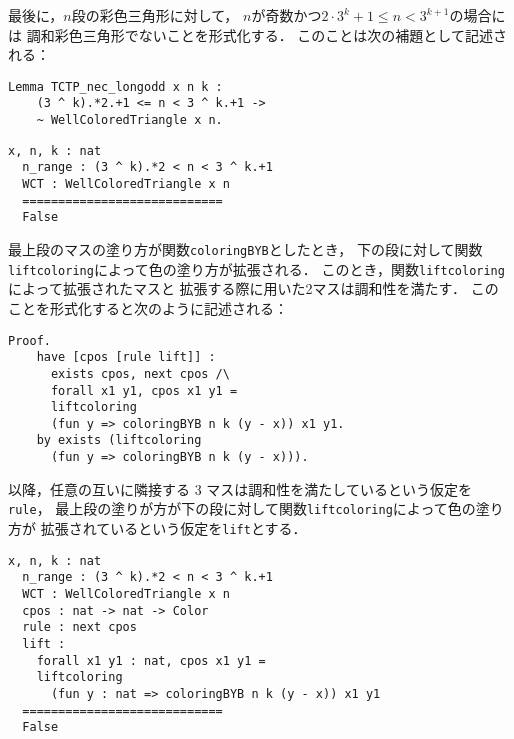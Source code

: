 最後に，$n$段の彩色三角形に対して，
$n$が奇数かつ$2 \cdot 3^{k} + 1 \leq n < 3^{k+1}$の場合には
調和彩色三角形でないことを形式化する．
このことは次の補題として記述される：
\begin{lstlisting}[language=Coq]
  Lemma TCTP_nec_longodd x n k :
    (3 ^ k).*2.+1 <= n < 3 ^ k.+1 ->
    ~ WellColoredTriangle x n.
\end{lstlisting}
\begin{lstlisting}[language=Coq]
  x, n, k : nat
  n_range : (3 ^ k).*2 < n < 3 ^ k.+1
  WCT : WellColoredTriangle x n
  ============================
  False
\end{lstlisting}
最上段のマスの塗り方が関数{\tt{coloringBYB}}としたとき，
下の段に対して関数{\tt{liftcoloring}}によって色の塗り方が拡張される．
このとき，関数{\tt{liftcoloring}}によって拡張されたマスと
拡張する際に用いた2マスは調和性を満たす．
このことを形式化すると次のように記述される：
\begin{lstlisting}[language=Coq]
  Proof.
    have [cpos [rule lift]] :
      exists cpos, next cpos /\
      forall x1 y1, cpos x1 y1 =
      liftcoloring
      (fun y => coloringBYB n k (y - x)) x1 y1.
    by exists (liftcoloring
      (fun y => coloringBYB n k (y - x))).
\end{lstlisting}
以降，任意の互いに隣接する 3 マスは調和性を満たしているという仮定を{\tt{rule}}，
最上段の塗りが方が下の段に対して関数{\tt{liftcoloring}}によって色の塗り方が
拡張されているという仮定を{\tt{lift}}とする．
\begin{lstlisting}[language=Coq]
  x, n, k : nat
  n_range : (3 ^ k).*2 < n < 3 ^ k.+1
  WCT : WellColoredTriangle x n
  cpos : nat -> nat -> Color
  rule : next cpos
  lift :
    forall x1 y1 : nat, cpos x1 y1 =
    liftcoloring
      (fun y : nat => coloringBYB n k (y - x)) x1 y1
  ============================
  False
\end{lstlisting}
